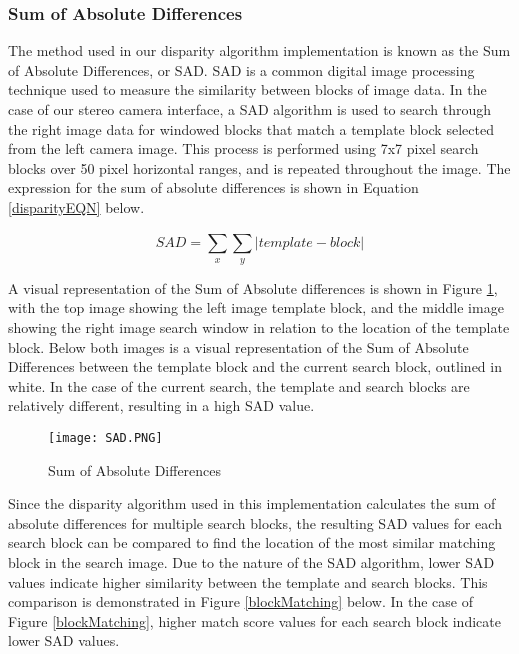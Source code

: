 \subsubsection{Sum of Absolute Differences}
The method used in our disparity algorithm implementation is known as the Sum of Absolute Differences, or SAD. SAD is a common digital image processing technique used to measure the similarity between blocks of image data. In the case of our stereo camera interface, a SAD algorithm is used to search through the right image data for windowed blocks that match a template block selected from the left camera image. This process is performed using 7x7 pixel search blocks over 50 pixel horizontal ranges, and is repeated throughout the image. The expression for the sum of absolute differences is shown in Equation \ref{disparityEQN} below. 
\par
\begin{equation}\label{disparityEQN}
SAD = \sum_{x}^{}\sum_{y}^{}|template-block|
\end{equation}
\par
A visual representation of the Sum of Absolute differences is shown in Figure \ref{SAD}, with the top image showing the left image template block, and the middle image showing the right image search window in relation to the location of the template block. Below both images is a visual representation of the Sum of Absolute Differences between the template block and the current search block, outlined in white. In the case of the current search, the template and search blocks are relatively different, resulting in a high SAD value. 
\par
\begin{figure}[H]
	\centerline{\texttt{[image: SAD.PNG]}}
	\caption{Sum of Absolute Differences \cite{mccormick}}
	\label{SAD}
\end{figure}
\par
Since the disparity algorithm used in this implementation calculates the sum of absolute differences for multiple search blocks, the resulting SAD values for each search block can be compared to find the location of the most similar matching block in the search image. Due to the nature of the SAD algorithm, lower SAD values indicate higher similarity between the template and search blocks. This comparison is demonstrated in Figure \ref{blockMatching} below. In the case of Figure 
\ref{blockMatching}, higher match score values for each search block indicate lower SAD values.
\par
